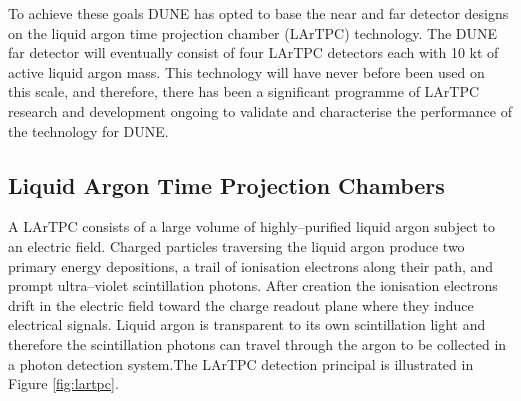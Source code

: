 To achieve these goals DUNE has opted to base the near and far detector designs
on the liquid argon time projection chamber (LArTPC) technology. The DUNE
far detector will eventually consist of four LArTPC detectors each with 10 kt 
of active liquid argon mass. This technology will have never before been used 
on this scale, and therefore, there has been a significant programme of LArTPC 
research and development ongoing to validate and characterise the performance 
of the technology for DUNE. 

\subsection{Liquid Argon Time Projection Chambers}
A LArTPC consists of a large volume of highly--purified liquid argon subject to
an electric field. Charged particles traversing the liquid argon produce two
primary energy depositions, a trail of ionisation electrons along their path,
and prompt ultra--violet scintillation photons. After creation the ionisation
electrons drift in the electric field toward the charge readout plane where they
induce electrical signals. Liquid argon is transparent to its own scintillation
light and therefore the scintillation photons can travel through the argon to be
collected in a photon detection system.The LArTPC detection principal is 
illustrated in Figure \ref{fig:lartpc}. 

